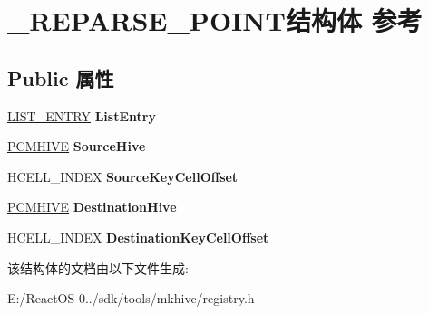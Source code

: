\hypertarget{struct___r_e_p_a_r_s_e___p_o_i_n_t}{}\section{\+\_\+\+R\+E\+P\+A\+R\+S\+E\+\_\+\+P\+O\+I\+N\+T结构体 参考}
\label{struct___r_e_p_a_r_s_e___p_o_i_n_t}
\subsection*{Public 属性}
\begin{DoxyCompactItemize}
\item 
\mbox{\label{struct___r_e_p_a_r_s_e___p_o_i_n_t_ac1d739f0218c4a66387dd37b969ca47c}} 
\hyperlink{struct___l_i_s_t___e_n_t_r_y}{L\+I\+S\+T\+\_\+\+E\+N\+T\+RY} {\bfseries List\+Entry}
\item 
\mbox{\label{struct___r_e_p_a_r_s_e___p_o_i_n_t_aeaf5fa111a024e7008095f8c79b72184}} 
\hyperlink{struct___c_m_h_i_v_e}{P\+C\+M\+H\+I\+VE} {\bfseries Source\+Hive}
\item 
\mbox{\label{struct___r_e_p_a_r_s_e___p_o_i_n_t_a1c32134b5f778c23a13830765fb4efce}} 
H\+C\+E\+L\+L\+\_\+\+I\+N\+D\+EX {\bfseries Source\+Key\+Cell\+Offset}
\item 
\mbox{\label{struct___r_e_p_a_r_s_e___p_o_i_n_t_a7af5a18a9878f7f8dbcd745e5b064a3c}} 
\hyperlink{struct___c_m_h_i_v_e}{P\+C\+M\+H\+I\+VE} {\bfseries Destination\+Hive}
\item 
\mbox{\label{struct___r_e_p_a_r_s_e___p_o_i_n_t_a61cc5aa8d1092f3ab859848daad5ea1d}} 
H\+C\+E\+L\+L\+\_\+\+I\+N\+D\+EX {\bfseries Destination\+Key\+Cell\+Offset}
\end{DoxyCompactItemize}


该结构体的文档由以下文件生成\+:\begin{DoxyCompactItemize}
\item 
E\+:/\+React\+O\+S-\/0../sdk/tools/mkhive/registry.\+h\end{DoxyCompactItemize}
